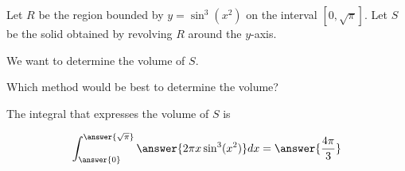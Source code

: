 \documentclass{ximera}
\author{Jason Miller}
\begin{document}
\begin{exercise}
Let $R$ be the region bounded by $y=\sin^{3}(x^{2})$ on the interval $\left[ 0, \sqrt{\pi} \right]$. Let $S$ be the solid obtained by revolving $R$ around the $y$-axis. 

We want to determine the volume of $S$. 


Which method would be best to determine the volume? 

\begin{multipleChoice}
\end{multipleChoice}

The integral that expresses the volume of $S$ is 

\begin{exercise}

\[
\int_{\answer{0}}^{\answer{ \sqrt{\pi}}} \answer{2\pi x \sin^{3}(x^{2})} dx=\answer{    \frac{4\pi}{3}       }
\]



\end{exercise}



\end{exercise}
\end{document}
